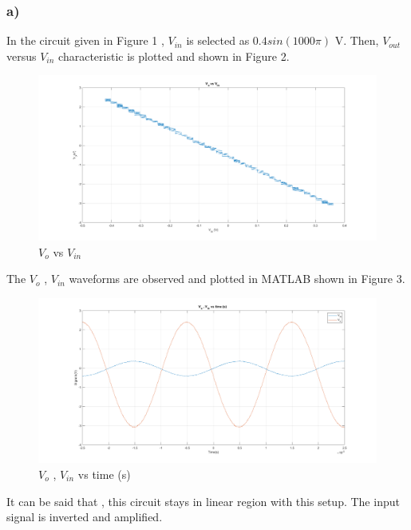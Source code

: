 \documentclass[letterpaper,12pt]{article}
\begin{document}
\subsubsection{a)}
In the circuit given in Figure 1 , \(V_{in}\) is selected as \(0.4sin(1000\pi)\) V. Then, \(V_{out}\) versus \(V_{in}\) characteristic is plotted and shown in Figure 2. 

\begin{figure}[H]
	\centering
   \includegraphics[width=1\textwidth]{1a_1.png}
   \caption{\(V_{o}\) vs \(V_{in}\)}
\end{figure}
The \(V_o\) , \(V_{in}\) waveforms are observed and plotted in MATLAB shown in Figure 3.
\begin{figure}[H]
	\centering
   \includegraphics[width=1\textwidth]{1a_2.png}
   \caption{\(V_{o}\) , \(V_{in}\) vs time (s) }
\end{figure}
It can be said that , this circuit stays in linear region with this setup. The input signal is inverted and amplified. 
\end{document}
